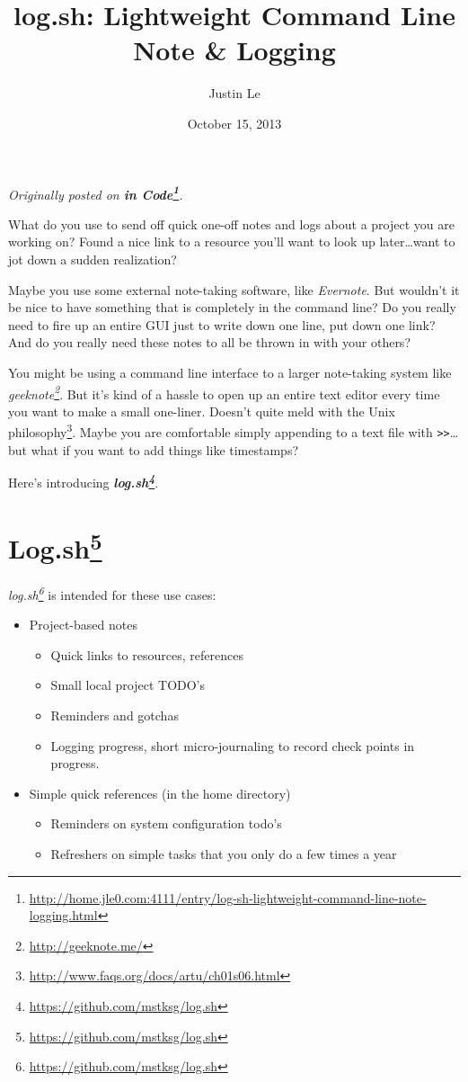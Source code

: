 \documentclass[]{article}
\title{log.sh: Lightweight Command Line Note \& Logging}
\author{Justin Le}
\date{October 15, 2013}
\renewcommand{\href}[2]{#2\footnote{\url{#1}}}
\begin{document}
\maketitle

\emph{Originally posted on
\textbf{\href{http://home.jle0.com:4111/entry/log-sh-lightweight-command-line-note-logging.html}{in
Code}}.}

What do you use to send off quick one-off notes and logs about a project you are
working on? Found a nice link to a resource you'll want to look up
later\ldots{}want to jot down a sudden realization?

Maybe you use some external note-taking software, like \emph{Evernote}. But
wouldn't it be nice to have something that is completely in the command line? Do
you really need to fire up an entire GUI just to write down one line, put down
one link? And do you really need these notes to all be thrown in with your
others?

You might be using a command line interface to a larger note-taking system like
\emph{\href{http://geeknote.me/}{geeknote}}. But it's kind of a hassle to open
up an entire text editor every time you want to make a small one-liner. Doesn't
quite meld with the \href{http://www.faqs.org/docs/artu/ch01s06.html}{Unix
philosophy}. Maybe you are comfortable simply appending to a text file with
\texttt{\textgreater{}\textgreater{}}\ldots{}but what if you want to add things
like timestamps?

Here's introducing
\textbf{\emph{\href{https://github.com/mstksg/log.sh}{log.sh}}}.

\section{\texorpdfstring{\href{https://github.com/mstksg/log.sh}{Log.sh}}{Log.sh}}\label{log.shlog.sh}

\emph{\href{https://github.com/mstksg/log.sh}{log.sh}} is intended for these use
cases:

\begin{itemize}
\tightlist
\item
  Project-based notes

  \begin{itemize}
  \tightlist
  \item
    Quick links to resources, references
  \item
    Small local project TODO's
  \item
    Reminders and gotchas
  \item
    Logging progress, short micro-journaling to record check points in progress.
  \end{itemize}
\item
  Simple quick references (in the home directory)

  \begin{itemize}
  \tightlist
  \item
    Reminders on system configuration todo's
  \item
    Refreshers on simple tasks that you only do a few times a year
  \end{itemize}
\end{itemize}
\end{document}
